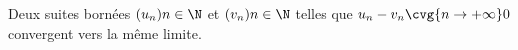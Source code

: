Deux suites bornées $(u_n){n\in\N}$ et $(v_n){n\in\N}$ telles que $u_n-v_n \cvg{n\to+\infty}  0$ convergent vers la même limite.

\begin{reponses}
\end{reponses}

